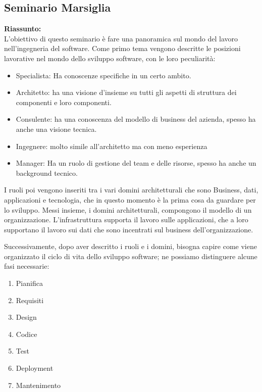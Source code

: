 \documentclass{article}
\begin{document}
\subsection{Seminario Marsiglia}
\textbf{Riassunto:}
\\
L'obiettivo di questo seminario è fare una panoramica sul mondo del lavoro nell'ingegneria del software.
Come primo tema vengono descritte le posizioni lavorative nel mondo dello sviluppo software, con le loro peculiarità:
\begin{itemize}
    \item Specialista: Ha conoscenze specifiche in un certo ambito.
    \item Architetto: ha una visione d'insieme su tutti gli aspetti di struttura dei componenti e loro componenti.
    \item Consulente: ha una conoscenza del modello di business del azienda, spesso ha anche una visione tecnica.
    \item Ingegnere: molto simile all'architetto ma con meno esperienza
    \item Manager: Ha un ruolo di gestione del team e delle risorse, spesso ha anche un background tecnico.
\end{itemize}
I ruoli poi vengono inseriti tra i vari domini architetturali che sono Business, dati, applicazioni e tecnologia, che in questo momento è la prima cosa da guardare per lo sviluppo.
Messi insieme, i domini architetturali, compongono il modello di un organizzazione. L'infrastruttura supporta il lavoro sulle applicazioni, che a loro supportano il lavoro sui dati che sono incentrati sul business dell'organizzazione.

Successivamente, dopo aver descritto i ruoli e i domini, bisogna capire come viene organizzato il ciclo di vita dello sviluppo software; ne possiamo distinguere alcune fasi necessarie:
\begin{enumerate}
    \item Pianifica
    \item Requisiti
    \item Design
    \item Codice
    \item Test
    \item Deployment
    \item Mantenimento
\end{enumerate}
\end{document}
